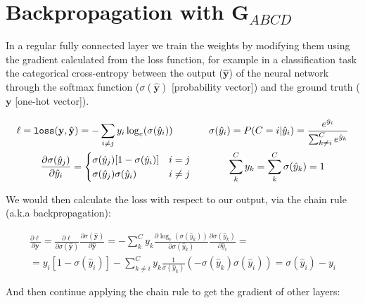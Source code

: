 \documentclass[journal,onecolumn]{IEEEtran}
\newcommand{\vtt}[1]{%
  \text{\normalfont\ttfamily\detokenize{#1}}%
}
\begin{document}
\newpage
\section{Backpropagation with $\mathbf{G}_{ABCD}$} \label{sec:bck}
    In a regular fully connected layer we train the weights by modifying them using the gradient calculated from the loss function, for example in a classification task the categorical cross-entropy %
    between the output ($\hat{\mathbf{y}}$) of the neural network through the softmax function ($\sigma( \hat{\mathbf{y}})$ [probability vector]) and the ground truth ($\mathbf{y}$ [one-hot vector]).

    \begin{gather*} %
        \ell = \vtt{loss}(\mathbf{y},\hat{\mathbf{y}}) = -\sum^{}_{i \ne j} y_i  \log_e(\sigma(\hat{y}_i)) ~~~~~~~~~~~
        \sigma(\hat{y}_i) = P(C=i|\hat{y}_i) = \frac{e^{\hat{y}_i}}{\sum^{C}_{k \ne i} e^{\hat{y}_k}} \\
        \frac{\partial \sigma(\hat{y}_j)}{\partial \hat{y}_i} = 
        \begin{cases}
            \sigma(\hat{y}_j)[1 - \sigma(\hat{y}_i)] & i = j \\
            \sigma(\hat{y}_j) \sigma(\hat{y}_i) & i \ne j \\
        \end{cases} ~~~~~~~~~~~
        \sum^{C}_{k} y_k = \sum^{C}_{k} \sigma(\hat{y}_k) = 1 \\
    \end{gather*}
    
    We would then calculate the loss with respect to our output, via the chain rule (a.k.a backpropagation):
    
    \begin{gather*}
        \frac{\partial \ell}{\partial \hat{\mathbf{y}}} = \frac{\partial \ell}{\partial \sigma(\hat{\mathbf{y}})} \frac{\partial \sigma(\hat{\mathbf{y}})}{\partial \hat{\mathbf{y}}} = -\sum^{C}_{k} y_k \frac{\partial \log_e(\sigma(\hat{y}_k))}{\partial \sigma(\hat{y}_k)} \frac{\partial \sigma(\hat{y}_k)}{\partial \hat{y}_i} = \\
         = y_i[1 - \sigma(\hat{y}_i)] -\sum^{C}_{k \ne i} y_k \frac{1}{\sigma(\hat{y}_k)} (-\sigma(\hat{y}_k) \sigma(\hat{y}_i)) = \sigma(\hat{y}_i) - y_i
    \end{gather*}
    
    And then continue applying the chain rule to get the gradient of other layers:
    
\end{document}
